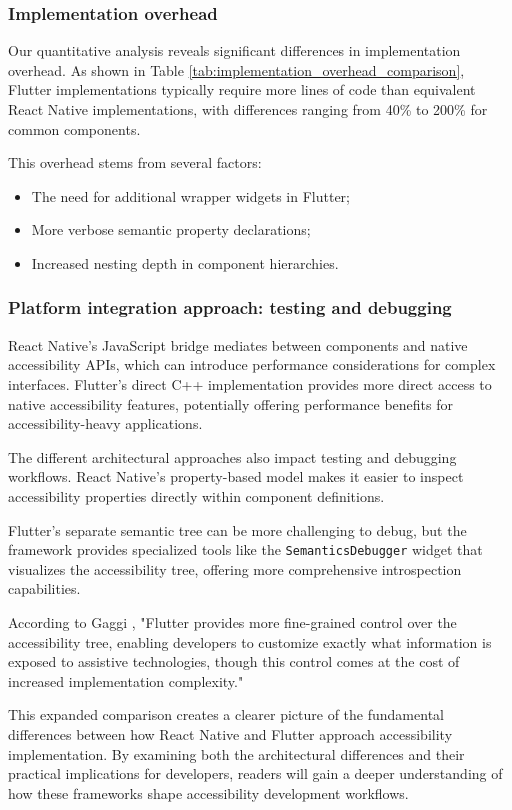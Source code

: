 \subsubsection{Implementation overhead}
Our quantitative analysis reveals significant differences in implementation overhead. As shown in Table \ref{tab:implementation_overhead_comparison}, Flutter implementations typically require more lines of code than equivalent React Native implementations, with differences ranging from 40\% to 200\% for common components.

This overhead stems from several factors:
\begin{itemize}
    \item The need for additional wrapper widgets in Flutter;
    \item More verbose semantic property declarations;
    \item Increased nesting depth in component hierarchies.
\end{itemize}

\subsubsection{Platform integration approach: testing and debugging}
React Native's JavaScript bridge mediates between components and native accessibility APIs, which can introduce performance considerations for complex interfaces. Flutter's direct C++ implementation provides more direct access to native accessibility features, potentially offering performance benefits for accessibility-heavy applications.

The different architectural approaches also impact testing and debugging workflows. React Native's property-based model makes it easier to inspect accessibility properties directly within component definitions.

Flutter's separate semantic tree can be more challenging to debug, but the framework provides specialized tools like the \texttt{SemanticsDebugger} widget that visualizes the accessibility tree, offering more comprehensive introspection capabilities.

According to Gaggi \cite{budai2024mobile}, "Flutter provides more fine-grained control over the accessibility tree, enabling developers to customize exactly what information is exposed to assistive technologies, though this control comes at the cost of increased implementation complexity."

This expanded comparison creates a clearer picture of the fundamental differences between how React Native and Flutter approach accessibility implementation. By examining both the architectural differences and their practical implications for developers, readers will gain a deeper understanding of how these frameworks shape accessibility development workflows.

